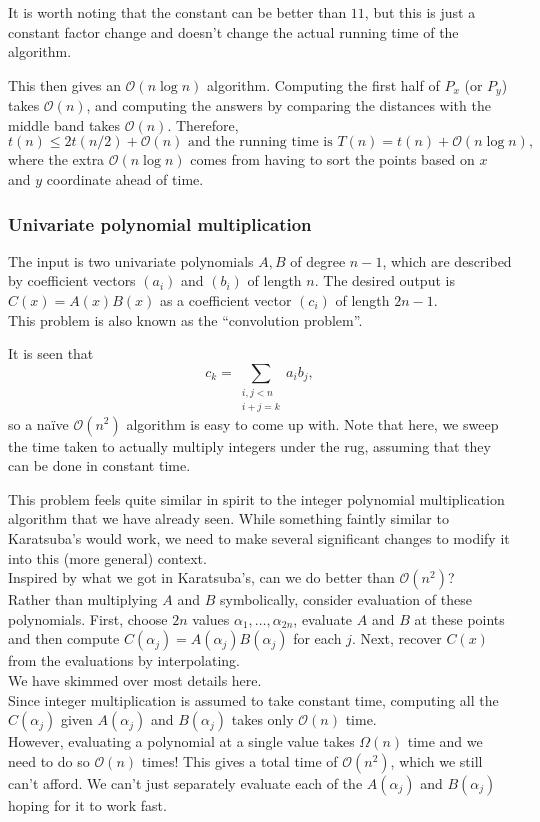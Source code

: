It is worth noting that the constant can be better than $11$, but this is just a constant factor change and doesn't change the actual running time of the algorithm.

This then gives an $\mathcal{O}(n\log n)$ algorithm. Computing the first half of $P_x$ (or $P_y$) takes $\mathcal{O}(n)$, and computing the answers by comparing the distances with the middle band takes $\mathcal{O}(n)$. Therefore, 
\[ t(n) \leq 2t(n/2) + \mathcal{O}(n)\text{ and the running time is }T(n)=t(n)+\mathcal{O}(n\log n), \]
where the extra $\mathcal{O}(n\log n)$ comes from having to sort the points based on $x$ and $y$ coordinate ahead of time.

\subsubsection{Univariate polynomial multiplication}

The input is two univariate polynomials $A,B$ of degree $n-1$, which are described by coefficient vectors $(a_i)$ and $(b_i)$ of length $n$. The desired output is $C(x)=A(x)B(x)$ as a coefficient vector $(c_i)$ of length $2n-1$.\\
This problem is also known as the ``convolution problem''.

It is seen that
\[ c_k = \sum_{\substack{i,j<n \\ i+j=k}} a_i b_j, \]
so a na\"ive $\mathcal{O}(n^2)$ algorithm is easy to come up with. Note that here, we sweep the time taken to actually multiply integers under the rug, assuming that they can be done in constant time.

This problem feels quite similar in spirit to the integer polynomial multiplication algorithm that we have already seen. While something faintly similar to Karatsuba's would work, we need to make several significant changes to modify it into this (more general) context.\\
Inspired by what we got in Karatsuba's, can we do better than $\mathcal{O}(n^2)$?\\

Rather than multiplying $A$ and $B$ symbolically, consider evaluation of these polynomials. First, choose $2n$ values $\alpha_1,\ldots,\alpha_{2n}$, evaluate $A$ and $B$ at these points and then compute $C(\alpha_j)=A(\alpha_j)B(\alpha_j)$ for each $j$. Next, recover $C(x)$ from the evaluations by interpolating.\\
We have skimmed over most details here.\\
Since integer multiplication is assumed to take constant time, computing all the $C(\alpha_j)$ given $A(\alpha_j)$ and $B(\alpha_j)$ takes only $\mathcal{O}(n)$ time.\\
However, evaluating a polynomial at a single value takes $\Omega(n)$ time and we need to do so $\mathcal{O}(n)$ times! This gives a total time of $\mathcal{O}(n^2)$, which we still can't afford. We can't just separately evaluate each of the $A(\alpha_j)$ and $B(\alpha_j)$ hoping for it to work fast.\\

